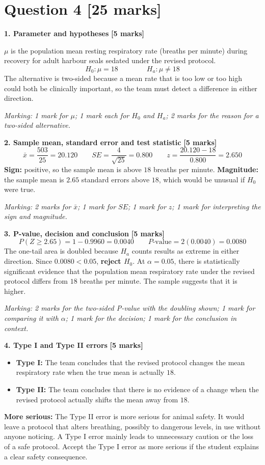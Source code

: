 \documentclass[10pt,letterpaper]{article}
\newcommand{\partmarks}[1]{\hfill\textbf{[#1 marks]}}
\newcommand{\allocation}[1]{\par\smallskip\textit{Marking: #1}\par}
\begin{document}
\newpage
\section*{Question 4 \hfill [25 marks]}

\textbf{1. Parameter and hypotheses} \partmarks{5}

$\mu$ is the population mean resting respiratory rate (breaths per minute) during recovery for adult harbour seals sedated under the revised protocol.
$$H_0:\mu=18 \qquad\qquad H_a:\mu\ne18$$
The alternative is two-sided because a mean rate that is too low or too high could both be clinically important, so the team must detect a difference in either direction.

\allocation{1 mark for $\mu$; 1 mark each for $H_0$ and $H_a$; 2 marks for the reason for a two-sided alternative.}

\textbf{2. Sample mean, standard error and test statistic} \partmarks{5}
$$\bar x=\frac{503}{25}=20.120 \qquad SE=\frac{4}{\sqrt{25}}=0.800 \qquad z=\frac{20.120-18}{0.800}=\boxed{2.650}$$
\textbf{Sign:} positive, so the sample mean is above $18$ breaths per minute. \textbf{Magnitude:} the sample mean is $2.65$ standard errors above $18$, which would be unusual if $H_0$ were true.

\allocation{2 marks for $\bar x$; 1 mark for $SE$; 1 mark for $z$; 1 mark for interpreting the sign and magnitude.}

\textbf{3. P-value, decision and conclusion} \partmarks{5}
$$P(Z\ge2.65)=1-0.9960=0.0040 \qquad P\text{-value}=2(0.0040)=\boxed{0.0080}$$
The one-tail area is doubled because $H_a$ counts results as extreme in either direction. Since $0.0080<0.05$, \textbf{reject $H_0$}. At $\alpha=0.05$, there is statistically significant evidence that the population mean respiratory rate under the revised protocol differs from $18$ breaths per minute. The sample suggests that it is higher.

\allocation{2 marks for the two-sided P-value with the doubling shown; 1 mark for comparing it with $\alpha$; 1 mark for the decision; 1 mark for the conclusion in context.}

\textbf{4. Type I and Type II errors} \partmarks{5}
\begin{itemize}
\item \textbf{Type I:} The team concludes that the revised protocol changes the mean respiratory rate when the true mean is actually $18$.
\item \textbf{Type II:} The team concludes that there is no evidence of a change when the revised protocol actually shifts the mean away from $18$.
\end{itemize}
\textbf{More serious:} The Type II error is more serious for animal safety. It would leave a protocol that alters breathing, possibly to dangerous levels, in use without anyone noticing. A Type I error mainly leads to unnecessary caution or the loss of a safe protocol. Accept the Type I error as more serious if the student explains a clear safety consequence.
\end{document}
